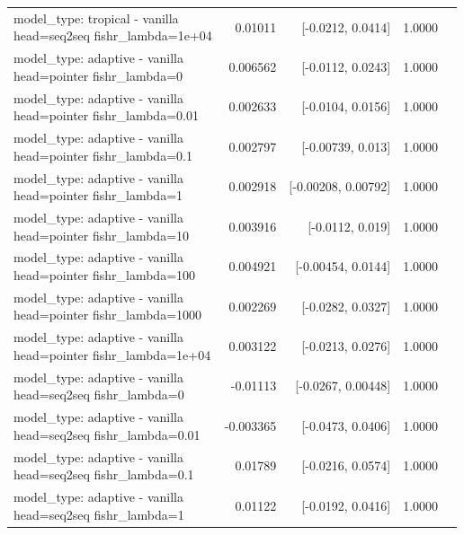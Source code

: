 \documentclass[10pt]{article}
\makeatletter
\newcommand{\stackcell}[1]{\begin{tabular}[t]{@{}l@{}}#1\end{tabular}}
\makeatother
\begin{document}
{\begin{longtable}{lrrrl}
\stackcell{model\_type: tropical - vanilla\\\footnotesize head=seq2seq fishr\_lambda=1e+04 } & 0.01011 & [-0.0212, 0.0414] & 1.0000 & \\
\stackcell{model\_type: adaptive - vanilla\\\footnotesize head=pointer fishr\_lambda=0 } & 0.006562 & [-0.0112, 0.0243] & 1.0000 & \\
\stackcell{model\_type: adaptive - vanilla\\\footnotesize head=pointer fishr\_lambda=0.01 } & 0.002633 & [-0.0104, 0.0156] & 1.0000 & \\
\stackcell{model\_type: adaptive - vanilla\\\footnotesize head=pointer fishr\_lambda=0.1 } & 0.002797 & [-0.00739, 0.013] & 1.0000 & \\
\stackcell{model\_type: adaptive - vanilla\\\footnotesize head=pointer fishr\_lambda=1 } & 0.002918 & [-0.00208, 0.00792] & 1.0000 & \\
\stackcell{model\_type: adaptive - vanilla\\\footnotesize head=pointer fishr\_lambda=10 } & 0.003916 & [-0.0112, 0.019] & 1.0000 & \\
\stackcell{model\_type: adaptive - vanilla\\\footnotesize head=pointer fishr\_lambda=100 } & 0.004921 & [-0.00454, 0.0144] & 1.0000 & \\
\stackcell{model\_type: adaptive - vanilla\\\footnotesize head=pointer fishr\_lambda=1000 } & 0.002269 & [-0.0282, 0.0327] & 1.0000 & \\
\stackcell{model\_type: adaptive - vanilla\\\footnotesize head=pointer fishr\_lambda=1e+04 } & 0.003122 & [-0.0213, 0.0276] & 1.0000 & \\
\stackcell{model\_type: adaptive - vanilla\\\footnotesize head=seq2seq fishr\_lambda=0 } & -0.01113 & [-0.0267, 0.00448] & 1.0000 & \\
\stackcell{model\_type: adaptive - vanilla\\\footnotesize head=seq2seq fishr\_lambda=0.01 } & -0.003365 & [-0.0473, 0.0406] & 1.0000 & \\
\stackcell{model\_type: adaptive - vanilla\\\footnotesize head=seq2seq fishr\_lambda=0.1 } & 0.01789 & [-0.0216, 0.0574] & 1.0000 & \\
\stackcell{model\_type: adaptive - vanilla\\\footnotesize head=seq2seq fishr\_lambda=1 } & 0.01122 & [-0.0192, 0.0416] & 1.0000 & \\

\end{longtable}}
\end{document}
